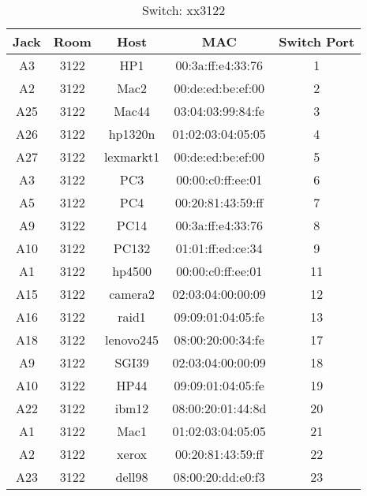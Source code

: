 \documentclass{article}
\begin{document}
\begin{table}[!htb]
	\centering
	\begin{tabular}{ | c | c | c | c | c | }
	\hline
	\textbf{Jack} & \textbf{Room} & \textbf{Host} & \textbf{MAC} & \textbf{Switch Port} \\ \hline
	A3 & 3122 & HP1 & 00:3a:ff:e4:33:76 & 1 \\ \hline
	A2 & 3122 & Mac2 & 00:de:ed:be:ef:00 & 2 \\ \hline
	A25 & 3122 & Mac44 & 03:04:03:99:84:fe & 3 \\ \hline
	A26 & 3122 & hp1320n & 01:02:03:04:05:05 & 4 \\ \hline
	A27 & 3122 & lexmarkt1 & 00:de:ed:be:ef:00 & 5 \\ \hline
	A3 & 3122 & PC3 & 00:00:c0:ff:ee:01 & 6 \\ \hline
	A5 & 3122 & PC4 & 00:20:81:43:59:ff & 7 \\ \hline
	A9 & 3122 & PC14 & 00:3a:ff:e4:33:76 & 8 \\ \hline
	A10 & 3122 & PC132 & 01:01:ff:ed:ce:34 & 9 \\ \hline
	A1 & 3122 & hp4500 & 00:00:c0:ff:ee:01 & 11 \\ \hline
	A15 & 3122 & camera2 & 02:03:04:00:00:09 & 12 \\ \hline
	A16 & 3122 & raid1 & 09:09:01:04:05:fe & 13 \\ \hline
	A18 & 3122 & lenovo245 & 08:00:20:00:34:fe & 17 \\ \hline
	A9 & 3122 & SGI39 & 02:03:04:00:00:09 & 18 \\ \hline
	A10 & 3122 & HP44 & 09:09:01:04:05:fe & 19 \\ \hline
	A22 & 3122 & ibm12 & 08:00:20:01:44:8d & 20 \\ \hline
	A1 & 3122 & Mac1 & 01:02:03:04:05:05 & 21 \\ \hline
	A2 & 3122 & xerox & 00:20:81:43:59:ff & 22 \\ \hline
	A23 & 3122 & dell98 & 08:00:20:dd:e0:f3 & 23 \\ \hline
	\end{tabular}
	\caption{Switch: xx3122}
\end{table}
\end{document}
